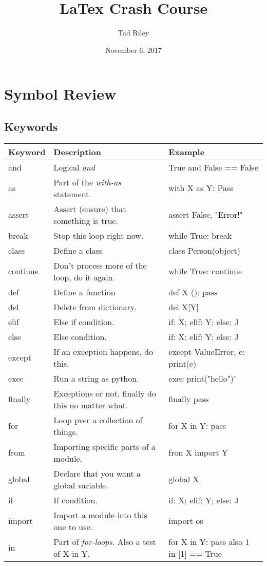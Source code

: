 \documentclass[12pt]{article}
\title{LaTex Crash Course}
\author{Tad Riley}
\date{November 6, 2017}
\begin{document}
\newpage

\section{Symbol Review}
\subsection{Keywords}%
\begin{tabular}{|l|p{3in}|l|}
	\hline
	\textbf{Keyword} & \textbf{Description} & \textbf{Example}\\ \hline
	and & Logical \textit{and} & True and False == False\\
	as & Part of the \textit{with-as} statement. & with X as Y: Pass\\
	assert & Assert (ensure) that something is true. & assert False, "Error!"\\
	break & Stop this loop right now. & while True: break\\
	class & Define a class & class Person(object)\\
	continue & Don't process more of the loop, do it again. & while True: continue\\
	def & Define a function & def X (): pass\\
	del & Delete from dictionary. & del X[Y]\\
	elif & Else if condition. & if: X; elif: Y; else: J\\
	else & Else condition. & if: X; elif: Y; else: J\\
	except & If an exception happens, do this. & except ValueError, e: print(e)\\
	exec & Run a string as python. & exec print("hello")'\\
	finally & Exceptions or not, finally do this no matter what. & finally pass\\
	for & Loop pver a collection of things. & for X in Y: pass\\
	from & Importing specific parts of a module. & fron X import Y\\
	global & Declare that you want a global variable. & global X\\
	if & If condition. & if: X; elif: Y; else: J\\
	import & Import a module into this one to use. & import os\\
	in & Part of \textit{for-loops}. Also a test of X in Y. & for X in Y: pass also 1 in [1] == True\\

\end{tabular}
\end{document}
